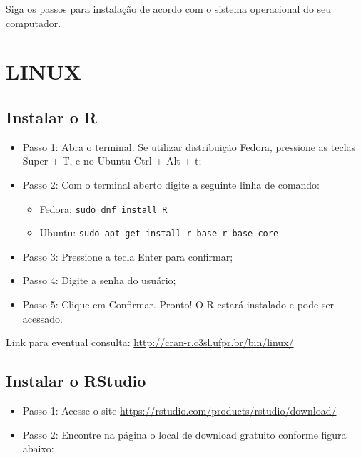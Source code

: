 \documentclass[
  10pt,
  brazil,
  a4paper,
  twoside, notitlepage, openright]{book}
\providecommand{\tightlist}{%
  \setlength{\itemsep}{0pt}\setlength{\parskip}{0pt}}
\begin{document}
Siga os passos para instalação de acordo com o sistema operacional do seu computador.

\hypertarget{linux}{%
\section{LINUX}\label{linux}}

\hypertarget{instalar-o-r}{%
\subsection{Instalar o R}\label{instalar-o-r}}

\begin{itemize}
\tightlist
\item
  Passo 1: Abra o terminal. Se utilizar distribuição Fedora, pressione as teclas Super + T, e no Ubuntu Ctrl + Alt + t;\\
\item
  Passo 2: Com o terminal aberto digite a seguinte linha de comando:

  \begin{itemize}
  \tightlist
  \item
    Fedora: \texttt{sudo\ dnf\ install\ R}
  \item
    Ubuntu: \texttt{sudo\ apt-get\ install\ r-base\ r-base-core}\\
  \end{itemize}
\item
  Passo 3: Pressione a tecla Enter para confirmar;\\
\item
  Passo 4: Digite a senha do usuário;\\
\item
  Passo 5: Clique em Confirmar. Pronto! O R estará instalado e pode ser acessado.
\end{itemize}

Link para eventual consulta: \url{http://cran-r.c3sl.ufpr.br/bin/linux/}

\hypertarget{instalar-o-rstudio}{%
\subsection{Instalar o RStudio}\label{instalar-o-rstudio}}

\begin{itemize}
\tightlist
\item
  Passo 1: Acesse o site \url{https://rstudio.com/products/rstudio/download/}\\
\item
  Passo 2: Encontre na página o local de download gratuito conforme figura abaixo:
\end{itemize}
\end{document}
